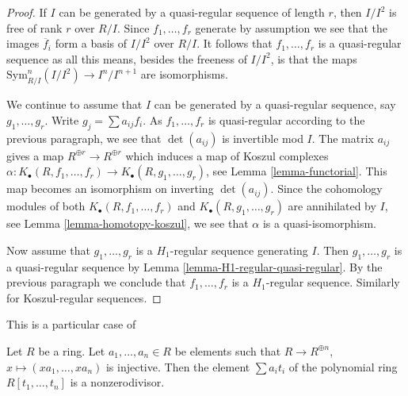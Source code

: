 \begin{proof}
If $I$ can be generated by a quasi-regular sequence of length $r$,
then $I/I^2$ is free of rank $r$ over $R/I$. Since $f_1, \ldots, f_r$
generate by assumption we see that the images $\overline{f}_i$ form a basis of
$I/I^2$ over $R/I$. It follows that $f_1, \ldots, f_r$ is a quasi-regular
sequence as all this means, besides the freeness of $I/I^2$, is that the maps
$\text{Sym}^n_{R/I}(I/I^2) \to I^n/I^{n + 1}$ are isomorphisms.

\medskip\noindent
We continue to assume that $I$ can be generated by a
quasi-regular sequence, say
$g_1, \ldots, g_r$. Write $g_j = \sum a_{ij}f_i$. As $f_1, \ldots, f_r$
is quasi-regular according to the previous paragraph, we see that
$\det(a_{ij})$ is invertible mod $I$. The matrix
$a_{ij}$ gives a map $R^{\oplus r} \to R^{\oplus r}$ which induces
a map of Koszul complexes
$\alpha : K_\bullet(R, f_1, \ldots, f_r) \to K_\bullet(R, g_1, \ldots, g_r)$,
see
Lemma \ref{lemma-functorial}.
This map becomes an isomorphism on inverting $\det(a_{ij})$.
Since the cohomology modules of both $K_\bullet(R, f_1, \ldots, f_r)$ and
$K_\bullet(R, g_1, \ldots, g_r)$ are annihilated by $I$, see
Lemma \ref{lemma-homotopy-koszul},
we see that $\alpha$ is a quasi-isomorphism.

\medskip\noindent
Now assume that $g_1, \ldots, g_r$ is a $H_1$-regular sequence generating $I$.
Then $g_1, \ldots, g_r$ is a quasi-regular sequence by
Lemma \ref{lemma-H1-regular-quasi-regular}. By the previous paragraph
we conclude that $f_1, \ldots, f_r$ is a $H_1$-regular sequence.
Similarly for Koszul-regular sequences.
\end{proof}

\begin{lemma}
\label{lemma-make-nonzero-divisor}
\begin{reference}
This is a particular case of \cite[Corollary]{McCoy}
\end{reference}
Let $R$ be a ring. Let $a_1, \ldots, a_n \in R$ be elements such
that $R \to R^{\oplus n}$, $x \mapsto (xa_1, \ldots, xa_n)$ is injective.
Then the element $\sum a_i t_i$ of the polynomial ring $R[t_1, \ldots, t_n]$
is a nonzerodivisor.
\end{lemma}

